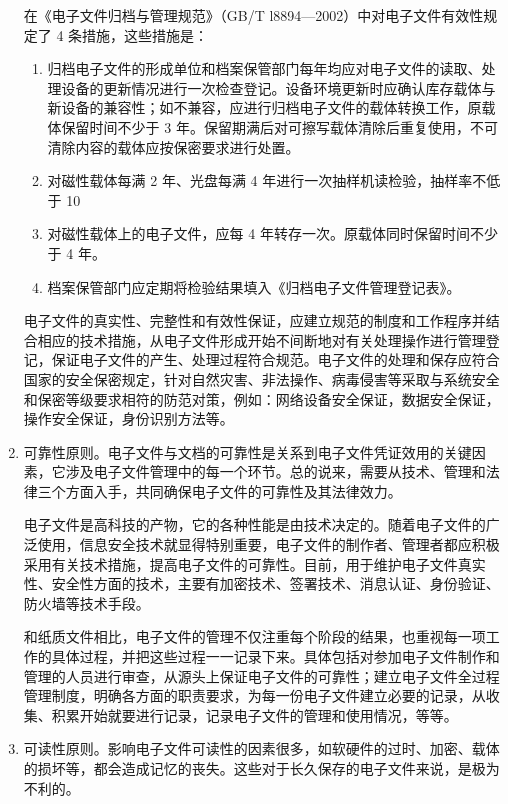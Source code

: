 \begin{enumerate}
        在《电子文件归档与管理规范》（GB/T l8894—2002）中对电子文件有效性规定了 4 条措施，这些措施是：
            \begin{enumerate}
                \item  归档电子文件的形成单位和档案保管部门每年均应对电子文件的读取、处理设备的更新情况进行一次检查登记。设备环境更新时应确认库存载体与新设备的兼容性；如不兼容，应进行归档电子文件的载体转换工作，原载体保留时间不少于 3 年。保留期满后对可擦写载体清除后重复使用，不可清除内容的载体应按保密要求进行处置。
                \item  对磁性载体每满 2 年、光盘每满 4 年进行一次抽样机读检验，抽样率不低于 10%
                \item  对磁性载体上的电子文件，应每 4 年转存一次。原载体同时保留时间不少于 4 年。
                \item  档案保管部门应定期将检验结果填入《归档电子文件管理登记表》。
            \end{enumerate}

        电子文件的真实性、完整性和有效性保证，应建立规范的制度和工作程序并结合相应的技术措施，从电子文件形成开始不间断地对有关处理操作进行管理登记，保证电子文件的产生、处理过程符合规范。电子文件的处理和保存应符合国家的安全保密规定，针对自然灾害、非法操作、病毒侵害等采取与系统安全和保密等级要求相符的防范对策，例如：网络设备安全保证，数据安全保证，操作安全保证，身份识别方法等。

        \item 可靠性原则。电子文件与文档的可靠性是关系到电子文件凭证效用的关键因素，它涉及电子文件管理中的每一个环节。总的说来，需要从技术、管理和法律三个方面入手，共同确保电子文件的可靠性及其法律效力。

        电子文件是高科技的产物，它的各种性能是由技术决定的。随着电子文件的广泛使用，信息安全技术就显得特别重要，电子文件的制作者、管理者都应积极采用有关技术措施，提高电子文件的可靠性。目前，用于维护电子文件真实性、安全性方面的技术，主要有加密技术、签署技术、消息认证、身份验证、防火墙等技术手段。

        和纸质文件相比，电子文件的管理不仅注重每个阶段的结果，也重视每一项工作的具体过程，并把这些过程一一记录下来。具体包括对参加电子文件制作和管理的人员进行审查，从源头上保证电子文件的可靠性；建立电子文件全过程管理制度，明确各方面的职责要求，为每一份电子文件建立必要的记录，从收集、积累开始就要进行记录，记录电子文件的管理和使用情况，等等。

        \item 可读性原则。影响电子文件可读性的因素很多，如软硬件的过时、加密、载体的损坏等，都会造成记忆的丧失。这些对于长久保存的电子文件来说，是极为不利的。


\end{enumerate}
